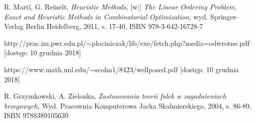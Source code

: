 \documentclass[twoside]{projektInzynierskiMS1}
\begin{document}
\begin{thebibliography}{12}
 R. Martí, G. Reinelt, \textit{Heuristic Methods}, [w:] \textit{The Linear Ordering Problem, Exact and Heuristic Methods in Combinatorial Optimization}, wyd. Springer-Verlag Berlin Heidelberg, 2011, s. 17-40, ISBN 978-3-642-16728-7

 http://prac.im.pwr.edu.pl/$\sim$plociniczak/lib/exe/fetch.php?media=odwrotne.pdf
[dostęp: 10 grudnia 2018]

 https://www.math.unl.edu/$\sim$scohn1/8423/wellposed.pdf
 [dostęp: 10 grudnia 2018]

 R. Grzymkowski, A. Zielonka, \textit{Zastosowania teorii falek w zagadnieniach brzegowych}, Wyd. Pracownia Komputerowa Jacka Skalmierskiego, 2004, s. 86-89, ISBN 9788389105639


\end{thebibliography}
\end{document}
